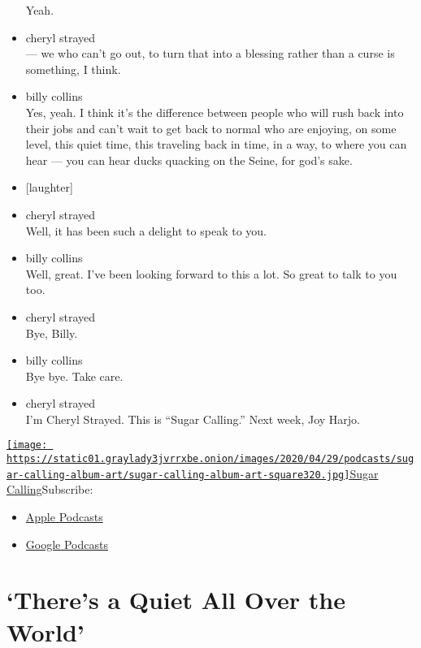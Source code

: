 \begin{itemize}
  Yeah.
\item
  cheryl strayed\\
  --- we who can't go out, to turn that into a blessing rather than a
  curse is something, I think.
\item
  billy collins\\
  Yes, yeah. I think it's the difference between people who will rush
  back into their jobs and can't wait to get back to normal who are
  enjoying, on some level, this quiet time, this traveling back in time,
  in a way, to where you can hear --- you can hear ducks quacking on the
  Seine, for god's sake.
\item
  {[}laughter{]}
\item
  cheryl strayed\\
  Well, it has been such a delight to speak to you.
\item
  billy collins\\
  Well, great. I've been looking forward to this a lot. So great to talk
  to you too.
\item
  cheryl strayed\\
  Bye, Billy.
\item
  billy collins\\
  Bye bye. Take care.
\item
  cheryl strayed\\
  I'm Cheryl Strayed. This is ``Sugar Calling.'' Next week, Joy Harjo.
\end{itemize}

\href{https://www.nytimes3xbfgragh.onion/column/sugar-calling}{\texttt{[image: https://static01.graylady3jvrrxbe.onion/images/2020/04/29/podcasts/sugar-calling-album-art/sugar-calling-album-art-square320.jpg]}Sugar
Calling}Subscribe:

\begin{itemize}
\tightlist
\item
  \href{https://itunes.apple.com/us/podcast/id1505881384}{Apple
  Podcasts}
\item
  \href{https://podcasts.google.com/?feed=aHR0cHM6Ly9yc3MuYXJ0MTkuY29tL3N1Z2FyLWNhbGxpbmc\&ved=0CAUQrrcFahcKEwjA8Kyn09voAhUAAAAAHQAAAAAQBQ}{Google
  Podcasts}
\end{itemize}

\hypertarget{theres-a-quiet-all-over-the-world-1}{%
\section{`There's a Quiet All Over the
World'}\label{theres-a-quiet-all-over-the-world-1}}

